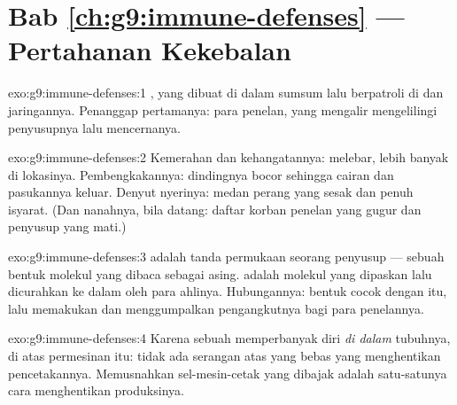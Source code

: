 \section*{Bab \ref{ch:g9:immune-defenses} --- Pertahanan Kekebalan}

\begin{solution}{exo:g9:immune-defenses:1}
, yang dibuat di dalam sumsum 
lalu berpatroli di  dan jaringannya. Penanggap
pertamanya: para penelan, yang mengalir mengelilingi
penyusupnya lalu mencernanya.
\end{solution}

\begin{solution}{exo:g9:immune-defenses:2}
Kemerahan dan kehangatannya:  melebar, lebih
banyak  di lokasinya. Pembengkakannya: dindingnya bocor
sehingga cairan dan pasukannya keluar. Denyut nyerinya:
medan perang yang sesak dan penuh isyarat. (Dan nanahnya,
bila datang: daftar korban penelan yang gugur dan penyusup
yang mati.)
\end{solution}

\begin{solution}{exo:g9:immune-defenses:3}
 adalah tanda permukaan seorang penyusup --- sebuah
bentuk molekul yang dibaca sebagai asing.  adalah
molekul yang dipaskan lalu dicurahkan ke dalam  oleh
para ahlinya. Hubungannya: bentuk  cocok dengan
 itu, lalu memakukan dan menggumpalkan pengangkutnya
bagi para penelannya.
\end{solution}

\begin{solution}{exo:g9:immune-defenses:4}
Karena sebuah  memperbanyak diri \emph{di dalam} 
tubuhnya, di atas permesinan  itu: tidak ada serangan
atas  yang bebas yang menghentikan pencetakannya.
Memusnahkan sel-mesin-cetak yang dibajak adalah satu-satunya
cara menghentikan produksinya.
\end{solution}

